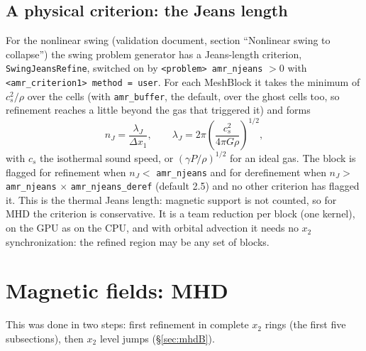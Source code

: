 \documentclass[11pt]{article}
\newcommand{\code}[1]{\texttt{#1}}
\newcommand{\fn}[1]{\texttt{\small #1}}
\begin{document}
\subsection{A physical criterion: the Jeans length}
\label{sec:jeanscrit}
For the nonlinear swing (validation document, section ``Nonlinear swing to collapse'') the swing problem
generator has a Jeans-length criterion, \fn{SwingJeansRefine}, switched on by
\code{<problem> amr\_njeans} $> 0$ with \code{<amr\_criterion1> method = user}. For each
MeshBlock it takes the minimum of $c_s^2/\rho$ over the cells (with \code{amr\_buffer},
the default, over the ghost cells too, so refinement reaches a little beyond the gas that
triggered it) and forms
\[
  n_J = \frac{\lambda_J}{\Delta x_1}, \qquad
  \lambda_J = 2\pi\left(\frac{c_s^2}{4\pi G\rho}\right)^{1/2},
\]
with $c_s$ the isothermal sound speed, or $(\gamma P/\rho)^{1/2}$ for an ideal gas. The block
is flagged for refinement when $n_J < $ \code{amr\_njeans} and for derefinement when
$n_J > $ \code{amr\_njeans}$\,\times\,$\code{amr\_njeans\_deref} (default 2.5) and no other
criterion has flagged it. This is the thermal Jeans length: magnetic support is not
counted, so for MHD the criterion is conservative. It is a team reduction per block (one
kernel), on the GPU as on the CPU, and with orbital advection it needs no $x_2$
synchronization: the refined region may be any set of blocks.

\section{Magnetic fields: MHD}
\label{sec:mhd}
This was done in two steps: first refinement in complete $x_2$ rings (the first five subsections),
then $x_2$ level jumps (\S\ref{sec:mhdB}).
\end{document}
